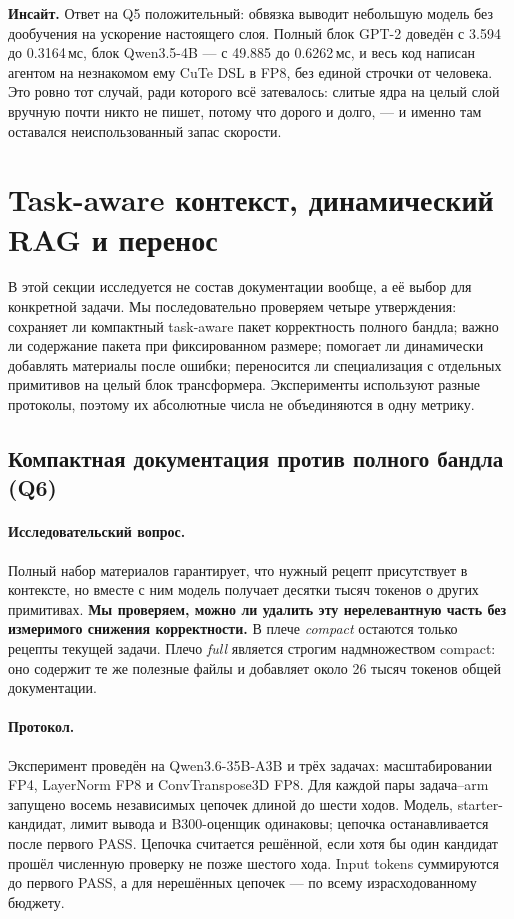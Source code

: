 \documentclass[10pt,a4paper]{article}
\newcommand{\insight}[1]{\par\smallskip\noindent\textbf{Инсайт.} #1\par\smallskip}
\begin{document}
\insight{Ответ на Q5 положительный: обвязка выводит небольшую модель без дообучения на
ускорение настоящего слоя. Полный блок GPT-2 доведён с 3.594 до
0.3164\,мс, блок Qwen3.5-4B --- с 49.885 до 0.6262\,мс, и весь код написан агентом на
незнакомом ему CuTe DSL в FP8, без единой строчки от человека. Это ровно тот случай, ради
которого всё затевалось: слитые ядра на целый слой вручную почти никто не пишет, потому что
дорого и долго, --- и именно там оставался неиспользованный запас скорости.}


\section{Task-aware контекст, динамический RAG и перенос}
\label{sec:compact}

В этой секции исследуется не состав документации вообще, а её выбор для
конкретной задачи. Мы последовательно проверяем четыре утверждения: сохраняет
ли компактный task-aware пакет корректность полного бандла; важно ли содержание
пакета при фиксированном размере; помогает ли динамически добавлять материалы
после ошибки; переносится ли специализация с отдельных примитивов на целый
блок трансформера. Эксперименты используют разные протоколы, поэтому их
абсолютные числа не объединяются в одну метрику.

\subsection{Компактная документация против полного бандла (Q6)}

\paragraph{Исследовательский вопрос.}
Полный набор материалов гарантирует, что нужный рецепт присутствует в
контексте, но вместе с ним модель получает десятки тысяч токенов о других
примитивах. \textbf{Мы проверяем, можно ли удалить эту нерелевантную часть без
измеримого снижения корректности.} В плече \emph{compact} остаются только
рецепты текущей задачи. Плечо \emph{full} является строгим
надмножеством compact: оно содержит те же полезные файлы и добавляет около
26 тысяч токенов общей документации.

\paragraph{Протокол.}
Эксперимент проведён на Qwen3.6-35B-A3B и трёх задачах: масштабировании FP4,
LayerNorm FP8 и ConvTranspose3D FP8. Для каждой пары задача--arm запущено
восемь независимых цепочек длиной до шести ходов. Модель, starter-кандидат,
лимит вывода и B300-оценщик одинаковы; цепочка останавливается после первого
PASS. Цепочка считается решённой, если хотя бы один кандидат прошёл численную
проверку не позже шестого хода. Input tokens суммируются до первого PASS, а
для нерешённых цепочек --- по всему израсходованному бюджету.
\end{document}
